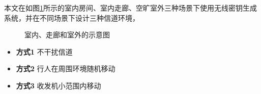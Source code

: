 \documentclass[master]{seuthesis} %
\begin{document}
\begin{Main}

本文在如图\ref{sketch_scene}所示的室内房间、室内走廊、空旷室外三种场景下使用无线密钥生成系统，并在不同场景下设计三种信道环境，

\begin{figure}
    \centering
    \quad
    \quad
    \quad
    \caption{室内、走廊和室外的示意图}{}
    \label{sketch_scene}
\end{figure}

\begin{itemize}
    \item \textbf{方式1} 不干扰信道
    \item \textbf{方式2} 行人在周围环境随机移动
    \item \textbf{方式3} 收发机小范围内移动   
\end{itemize}


\end{Main}
\end{document}
